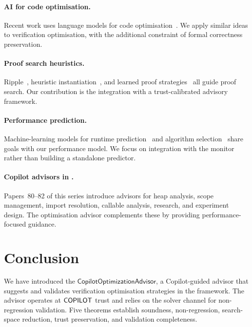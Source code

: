 \documentclass[11pt]{article}
\newcommand{\OptAdv}{\mathsf{CopilotOptimizationAdvisor}}
\begin{document}
\paragraph{AI for code optimisation.}
Recent work uses language models for code
optimisation~\cite{chen2023codeoptimize}.  We apply
similar ideas to verification optimisation, with the
additional constraint of formal correctness preservation.

\paragraph{Proof search heuristics.}
Ripple~\cite{basin1993rippling}, heuristic
instantiation~\cite{claessen2000quickcheck}, and
learned proof strategies~\cite{bansal2019holist}
all guide proof search.  Our contribution is the
integration with a trust-calibrated advisory framework.

\paragraph{Performance prediction.}
Machine-learning models for runtime
prediction~\cite{hutter2011sequential} and algorithm
selection~\cite{kotthoff2016algorithm} share goals
with our performance model.  We focus on integration
with the \JuGeo{} monitor rather than building a
standalone predictor.

\paragraph{Copilot advisors in \JuGeo{}.}
Papers~80--82 of this series introduce advisors for
heap analysis, scope management, import resolution,
callable analysis, research, and experiment design.
The optimisation advisor complements these by
providing performance-focused guidance.

\section{Conclusion}\label{sec:conclusion}

We have introduced the $\OptAdv$, a Copilot-guided
advisor that suggests and validates verification
optimisation strategies in the \JuGeo{} framework.
The advisor operates at $\mathsf{COPILOT}$ trust and relies
on the solver channel for non-regression validation.
Five theorems establish soundness, non-regression,
search-space reduction, trust preservation, and
validation completeness.
\end{document}
